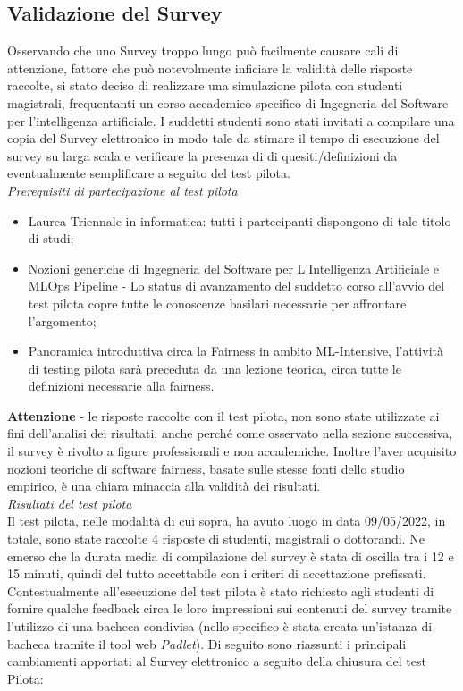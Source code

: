    



    \subsection{Validazione del Survey}
    
    Osservando che uno Survey troppo lungo può facilmente causare cali di attenzione, fattore che può notevolmente inficiare la validità delle risposte raccolte\cite{andrews2007conducting}, si stato deciso di realizzare una simulazione pilota con studenti magistrali, frequentanti un corso accademico specifico di Ingegneria del Software per l'intelligenza artificiale. I suddetti studenti sono stati invitati a compilare una copia del Survey elettronico in modo tale da stimare il tempo di esecuzione del survey su larga scala e verificare la presenza di di quesiti/definizioni da eventualmente semplificare a seguito del test pilota.\\
    
    \emph{Prerequisiti di partecipazione al test pilota}
    \begin{itemize}
        \item Laurea Triennale in informatica: tutti i partecipanti dispongono di tale titolo di studi;
        \item Nozioni generiche di Ingegneria del Software per L'Intelligenza Artificiale e MLOps Pipeline - Lo status di avanzamento del suddetto corso all'avvio del test pilota copre tutte le conoscenze basilari necessarie per affrontare l'argomento;
        \item Panoramica introduttiva circa la Fairness in ambito ML-Intensive, l'attività di testing pilota sarà preceduta da una lezione teorica, circa tutte le definizioni necessarie alla fairness.
    \end{itemize}
    
   \textbf{ Attenzione } - le risposte raccolte con il test pilota, non sono state utilizzate ai fini dell'analisi dei risultati, anche perché come osservato nella sezione successiva, il survey è rivolto a figure professionali e non accademiche. Inoltre l'aver acquisito nozioni teoriche di software fairness, basate sulle stesse fonti dello studio empirico, è una chiara minaccia alla validità dei risultati.\\
   
   \emph{Risultati del test pilota}\\
   Il test pilota, nelle modalità di cui sopra, ha avuto luogo in data 09/05/2022, in totale, sono state raccolte 4 risposte di studenti, magistrali o dottorandi. Ne emerso che la durata media di compilazione del survey è stata di oscilla tra i 12 e 15 minuti, quindi del tutto accettabile con i criteri di accettazione prefissati. Contestualmente all'esecuzione del test pilota è stato richiesto agli studenti di fornire qualche feedback circa le loro impressioni sui contenuti del survey tramite l'utilizzo di una bacheca condivisa (nello specifico è stata creata un'istanza di bacheca tramite il tool web \emph{Padlet}). Di seguito sono riassunti i principali cambiamenti apportati al Survey elettronico a seguito della chiusura del test Pilota:\\
   
